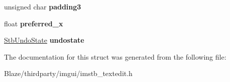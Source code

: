 \begin{DoxyCompactItemize}
\item 
\mbox{\label{structSTB__TexteditState_a4c42530e4919171df25b1f00bb95a887}} 
unsigned char {\bfseries padding3}
\item 
\mbox{\label{structSTB__TexteditState_a527319df94e0fe262548fb48bebf3dea}} 
float {\bfseries preferred\+\_\+x}
\item 
\mbox{\label{structSTB__TexteditState_a7e1f0366bbd57e01a4f49a720beb9ead}} 
\hyperlink{structStbUndoState}{Stb\+Undo\+State} {\bfseries undostate}
\end{DoxyCompactItemize}


The documentation for this struct was generated from the following file\+:\begin{DoxyCompactItemize}
\item 
Blaze/thirdparty/imgui/imstb\+\_\+textedit.\+h\end{DoxyCompactItemize}
